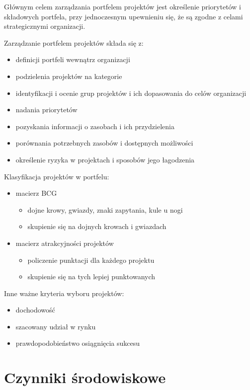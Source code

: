 Głównym celem zarządzania portfelem projektów jest określenie priorytetów i składowych portfela, przy jednoczesnym upewnieniu się, że są zgodne z celami strategicznymi organizacji.

Zarządzanie portfelem projektów składa się z:
\begin{itemize}
\item definicji portfeli wewnątrz organizacji
\item podzielenia projektów na kategorie
\item identyfikacji i ocenie grup projektów i ich dopasowania do celów organizacji
\item nadania priorytetów
\item pozyskania informacji o zasobach i ich przydzielenia
\item porównania potrzebnych zasobów i dostępnych możliwości
\item określenie ryzyka w projektach i sposobów jego łagodzenia
\end{itemize}

Klasyfikacja projektów w portfelu:
\begin{itemize}
\item macierz BCG
\begin{itemize}
\item dojne krowy, gwiazdy, znaki zapytania, kule u nogi
\item skupienie się na dojnych krowach i gwiazdach
\end{itemize}
\item macierz atrakcyjności projektów
\begin{itemize}
\item policzenie punktacji dla każdego projektu
\item skupienie się na tych lepiej punktowanych
\end{itemize}
\end{itemize}

Inne ważne kryteria wyboru projektów:
\begin{itemize}
\item dochodowość
\item szacowany udział w rynku
\item prawdopodobieństwo osiągnięcia sukcesu
\end{itemize}


\section{Czynniki środowiskowe}

